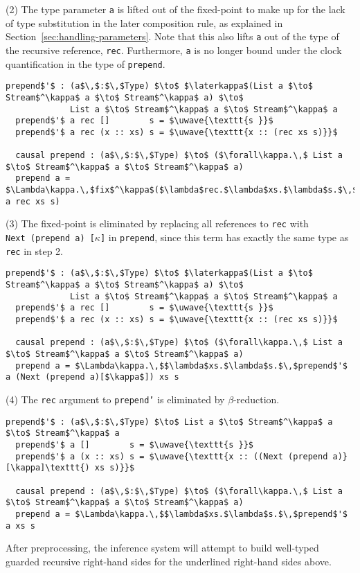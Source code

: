 (2) The type parameter \texttt{a} is lifted out of the fixed-point to make up
for the lack of type substitution in the later composition rule, as explained in
Section~\ref{sec:handling-parameters}. Note that this also lifts \texttt{a} out
of the type of the recursive reference, \texttt{rec}. Furthermore, \texttt{a} is
no longer bound under the clock quantification in the type of \texttt{prepend}.
\begin{lstlisting}[mathescape]
  prepend$'$ : (a$\,$:$\,$Type) $\to$ $\laterkappa$(List a $\to$ Stream$^\kappa$ a $\to$ Stream$^\kappa$ a) $\to$ 
             List a $\to$ Stream$^\kappa$ a $\to$ Stream$^\kappa$ a
  prepend$'$ a rec []        s = $\uwave{\texttt{s }}$
  prepend$'$ a rec (x :: xs) s = $\uwave{\texttt{x :: (rec xs s)}}$

  causal prepend : (a$\,$:$\,$Type) $\to$ ($\forall\kappa.\,$ List a $\to$ Stream$^\kappa$ a $\to$ Stream$^\kappa$ a)
  prepend a = $\Lambda\kappa.\,$fix$^\kappa$($\lambda$rec.$\lambda$xs.$\lambda$s.$\,$prepend$'$ a rec xs s)
\end{lstlisting}
(3) The fixed-point is eliminated by replacing all references to
\texttt{rec} with \texttt{Next~(prepend~a)~[$\kappa$]} in \texttt{prepend}, since this term has
exactly the same type as \texttt{rec} in step 2.
\begin{lstlisting}[mathescape]
  prepend$'$ : (a$\,$:$\,$Type) $\to$ $\laterkappa$(List a $\to$ Stream$^\kappa$ a $\to$ Stream$^\kappa$ a) $\to$ 
             List a $\to$ Stream$^\kappa$ a $\to$ Stream$^\kappa$ a
  prepend$'$ a rec []        s = $\uwave{\texttt{s }}$
  prepend$'$ a rec (x :: xs) s = $\uwave{\texttt{x :: (rec xs s)}}$

  causal prepend : (a$\,$:$\,$Type) $\to$ ($\forall\kappa.\,$ List a $\to$ Stream$^\kappa$ a $\to$ Stream$^\kappa$ a)
  prepend a = $\Lambda\kappa.\,$$\lambda$xs.$\lambda$s.$\,$prepend$'$ a (Next (prepend a)[$\kappa$]) xs s
\end{lstlisting}
(4) The \texttt{rec} argument to \texttt{prepend'} is eliminated by
$\beta$-reduction.
\begin{lstlisting}[mathescape]
  prepend$'$ : (a$\,$:$\,$Type) $\to$ List a $\to$ Stream$^\kappa$ a $\to$ Stream$^\kappa$ a
  prepend$'$ a []        s = $\uwave{\texttt{s }}$
  prepend$'$ a (x :: xs) s = $\uwave{\texttt{x :: ((Next (prepend a)}[\kappa]\texttt{) xs s)}}$

  causal prepend : (a$\,$:$\,$Type) $\to$ ($\forall\kappa.\,$ List a $\to$ Stream$^\kappa$ a $\to$ Stream$^\kappa$ a)
  prepend a = $\Lambda\kappa.\,$$\lambda$xs.$\lambda$s.$\,$prepend$'$ a xs s
\end{lstlisting}
After preprocessing, the inference system will attempt to build well-typed
guarded recursive right-hand sides for the underlined right-hand sides above.

